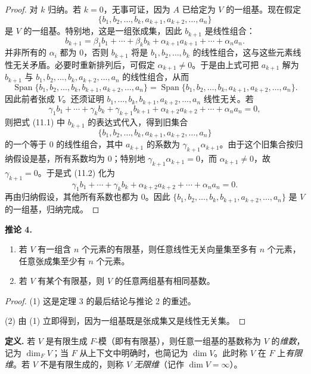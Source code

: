 \begin{proof}
对 $k$ 归纳。若 $k=0$，无事可证，因为 $A$ 已给定为 $V$ 的一组基。现在假定
\[
\{b_1,b_2,\ldots,b_k,a_{k+1},a_{k+2},\ldots,a_n\}
\]
是 $V$ 的一组基。特别地，这是一组张成集，因此 $b_{k+1}$ 是线性组合：
\begin{equation}
 b_{k+1}=\beta_1b_1+\cdots+\beta_kb_k+\alpha_{k+1}a_{k+1}+\cdots+\alpha_na_n.
\tag{11.1}
\end{equation}
并非所有的 $\alpha_i$ 都为 $0$，否则 $b_{k+1}$ 将是 $b_1,b_2,\ldots,b_k$ 的线性组合，这与这些元素线性无关矛盾。必要时重新排列后，可假定 $\alpha_{k+1}\neq0$。于是由上式可把 $a_{k+1}$ 解为 $b_{k+1}$ 与 $b_1,b_2,\ldots,b_k,a_{k+2},\ldots,a_n$ 的线性组合，从而
\[
\operatorname{Span}\{b_1,b_2,\ldots,b_k,b_{k+1},a_{k+2},\ldots,a_n\}
=
\operatorname{Span}\{b_1,b_2,\ldots,b_k,a_{k+1},a_{k+2},\ldots,a_n\}.
\]
因此前者张成 $V$。还须证明 $b_1,\ldots,b_k,b_{k+1},a_{k+2},\ldots,a_n$ 线性无关。若
\begin{equation}
\gamma_1b_1+\cdots+\gamma_kb_k+\gamma_{k+1}b_{k+1}
+\alpha_{k+2}a_{k+2}+\cdots+\alpha_na_n=0,
\tag{11.2}
\end{equation}
则把式 (11.1) 中 $b_{k+1}$ 的表达式代入，得到旧集合
\[
\{b_1,b_2,\ldots,b_k,a_{k+1},a_{k+2},\ldots,a_n\}
\]
的一个等于 $0$ 的线性组合，其中 $a_{k+1}$ 的系数为 $\gamma_{k+1}\alpha_{k+1}$。由于这个旧集合按归纳假设是基，所有系数均为 $0$；特别地 $\gamma_{k+1}\alpha_{k+1}=0$，而 $\alpha_{k+1}\neq0$，故 $\gamma_{k+1}=0$。于是式 (11.2) 化为
\[
\gamma_1b_1+\cdots+\gamma_kb_k+
\alpha_{k+2}a_{k+2}+\cdots+\alpha_na_n=0.
\]
再由归纳假设，其他所有系数也都为 $0$。因此
$\{b_1,b_2,\ldots,b_k,b_{k+1},a_{k+2},\ldots,a_n\}$ 是 $V$ 的一组基，归纳完成。
\end{proof}

\noindent\textbf{推论 4.}
\begin{enumerate}[label=(\arabic*)]
\item 若 $V$ 有一组含 $n$ 个元素的有限基，则任意线性无关向量集至多有 $n$ 个元素，任意张成集至少有 $n$ 个元素。
\item 若 $V$ 有某个有限基，则 $V$ 的任意两组基有相同基数。
\end{enumerate}

\begin{proof}
(1) 这是定理 3 的最后结论与推论 2 的重述。

(2) 由 (1) 立即得到，因为一组基既是张成集又是线性无关集。
\end{proof}

\noindent\textbf{定义.} 若 $V$ 是有限生成 $F$-模（即有有限基），则任意一组基的基数称为 $V$ 的\emph{维数}，记为 $\dim_F V$；当 $F$ 从上下文中明确时，也简记为 $\dim V$。此时称 $V$ 在 $F$ 上\emph{有限维}。若 $V$ 不是有限生成的，则称 $V$ \emph{无限维}（记作 $\dim V=\infty$）。

